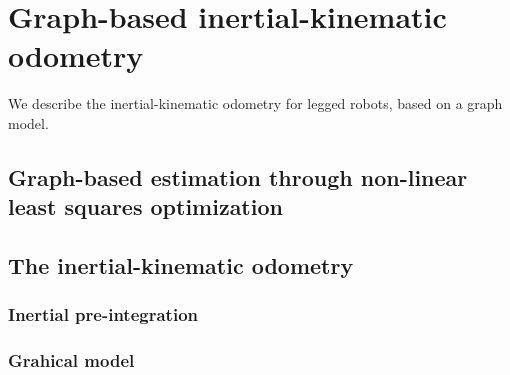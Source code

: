 
\section{Graph-based inertial-kinematic odometry}

We describe the inertial-kinematic odometry for legged robots, based on a graph model. 

\subsection{Graph-based estimation through non-linear least squares optimization}

\subsection{The inertial-kinematic odometry}

\subsubsection{Inertial pre-integration}

\subsubsection{Grahical model}


